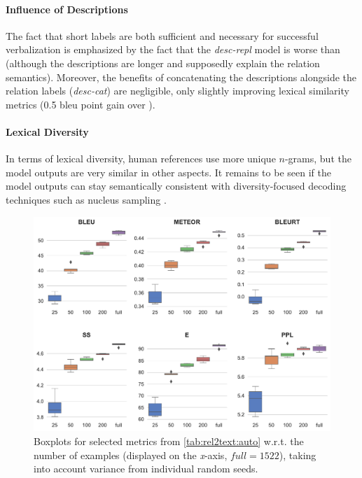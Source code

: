 \paragraph{Influence of Descriptions} The fact that short labels are both sufficient and necessary for successful verbalization is emphasized by the fact that the \textit{desc-repl} model is worse than \BARTr{} (although the descriptions are longer and supposedly explain the relation semantics). Moreover, the benefits of concatenating the descriptions alongside the relation labels (\textit{desc-cat}) are negligible, only slightly improving lexical similarity metrics (0.5 \acs{bleu} point gain over \BARTr{}).

\paragraph{Lexical Diversity} In terms of lexical diversity, human references use more unique $n$-grams, but the model outputs are very similar in other aspects. It remains to be seen if the model outputs can stay semantically consistent with diversity-focused decoding techniques such as nucleus sampling \cite{holtzman2019curious}.

\begin{figure}[t]
    \centering
    \includegraphics[width=\textwidth]{img/rel2text-fewshot.pdf}
    \caption[Selected automatic metrics on few-shot generation.]{Boxplots for selected metrics from \autoref{tab:rel2text:auto} w.r.t. the number of examples (displayed on the \textit{x}-axis, $\textit{full} = 1522$), taking into account variance from individual random seeds.}\label{fig:rel2text:fewshot}
\end{figure}

